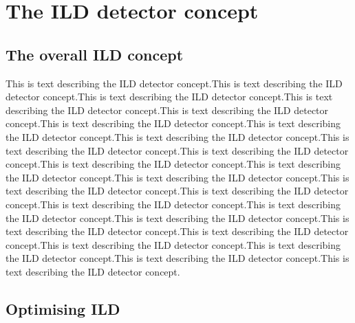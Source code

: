\chapter{The ILD detector concept}


\section{The overall ILD concept}
This is text describing the ILD detector concept.This is text describing the ILD detector concept.This is text describing the ILD detector concept.This is text describing the ILD detector concept.This is text describing the ILD detector concept.This is text describing the ILD detector concept.This is text describing the ILD detector concept.This is text describing the ILD detector concept.This is text describing the ILD detector concept.This is text describing the ILD detector concept.This is text describing the ILD detector concept.This is text describing the ILD detector concept.This is text describing the ILD detector concept.This is text describing the ILD detector concept.This is text describing the ILD detector concept.This is text describing the ILD detector concept.This is text describing the ILD detector concept.This is text describing the ILD detector concept.This is text describing the ILD detector concept.This is text describing the ILD detector concept.This is text describing the ILD detector concept.This is text describing the ILD detector concept.This is text describing the ILD detector concept.This is text describing the ILD detector concept.


\section{Optimising ILD}
